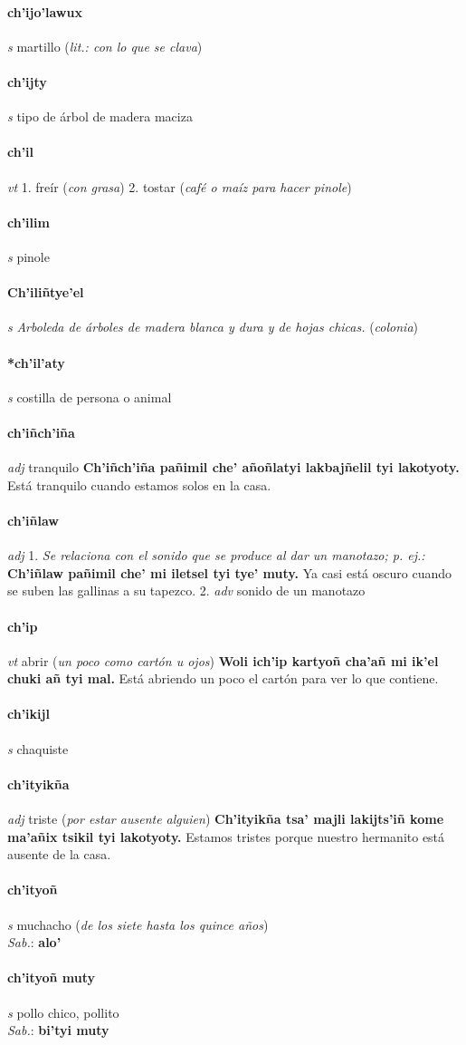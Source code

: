 \documentclass{scrbook}
\newcommand{\entry}[1]{\paragraph{#1}}
\newcommand{\onedefinition}[1]{#1.}
\newcommand{\nontranslationdef}[1]{\textit{#1}}
\newcommand{\partofspeech}[1]{\textit{#1}}
\newcommand{\spanishtranslation}[1]{#1}
\newcommand{\clarification}[1]{(\textit{#1})}
\newcommand{\cholexample}[1]{\textbf{#1}}
\newcommand{\exampletranslation}[1]{#1}
\newcommand{\dialectvariant}[1]{\\\textit{#1}:}
\newcommand{\dialectword}[1]{\textbf{#1}}
\begin{document}
\begin{multicols}{2}
\entry{ch'ijo'lawux}
\partofspeech{s}
\spanishtranslation{martillo}
\clarification{lit.: con lo que se clava}

\entry{ch'ijty}
\partofspeech{s}
\spanishtranslation{tipo de árbol de madera maciza}

\entry{ch'il}
\partofspeech{vt}
\onedefinition{1}
\spanishtranslation{freír}
\clarification{con grasa}
\onedefinition{2}
\spanishtranslation{tostar}
\clarification{café o maíz para hacer pinole}

\entry{ch'ilim}
\partofspeech{s}
\spanishtranslation{pinole}

\entry{Ch'iliñtye'el}
\partofspeech{s}
\nontranslationdef{Arboleda de árboles de madera blanca y dura y de hojas chicas.}
\clarification{colonia}

\entry{*ch'il'aty}
\partofspeech{s}
\spanishtranslation{costilla de persona o animal}

\entry{ch'iñch'iña}
\partofspeech{adj}
\spanishtranslation{tranquilo}
\cholexample{Ch'iñch'iña pañimil che' añoñlatyi lakbajñelil tyi lakotyoty.}
\exampletranslation{Está tranquilo cuando estamos solos en la casa.}

\entry{ch'iñlaw}
\partofspeech{adj}
\onedefinition{1}
\nontranslationdef{Se relaciona con el sonido que se produce al dar un manotazo; p. ej.:}
\cholexample{Ch'iñlaw pañimil che' mi iletsel tyi tye' muty.}
\exampletranslation{Ya casi está oscuro cuando se suben las gallinas a su tapezco.}
\onedefinition{2}
\partofspeech{adv}
\spanishtranslation{sonido de un manotazo}

\entry{ch'ip}
\partofspeech{vt}
\spanishtranslation{abrir}
\clarification{un poco como cartón u ojos}
\cholexample{Woli ich'ip kartyoñ cha'añ mi ik'el chuki añ tyi mal.}
\exampletranslation{Está abriendo un poco el cartón para ver lo que contiene.}

\entry{ch'ikijl}
\partofspeech{s}
\spanishtranslation{chaquiste}

\entry{ch'ityikña}
\partofspeech{adj}
\spanishtranslation{triste}
\clarification{por estar ausente alguien}
\cholexample{Ch'ityikña tsa' majli lakijts'iñ kome ma'añix tsikil tyi lakotyoty.}
\exampletranslation{Estamos tristes porque nuestro hermanito está ausente de la casa.}

\entry{ch'ityoñ}
\partofspeech{s}
\spanishtranslation{muchacho}
\clarification{de los siete hasta los quince años}
\dialectvariant{Sab.}
\dialectword{alo'}

\entry{ch'ityoñ muty}
\partofspeech{s}
\spanishtranslation{pollo chico, pollito}
\dialectvariant{Sab.}
\dialectword{bi'tyi muty}


\end{multicols}
\end{document}
